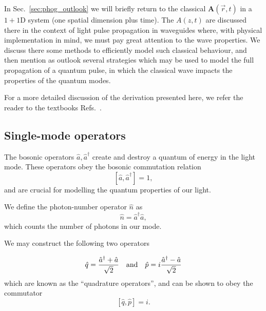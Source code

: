 In Sec.~\ref{sec:phog_outlook} we will briefly return to the classical $\bm{A}\left(\overrightarrow{r}, t\right)$ in a $1+1$D system (one spatial dimension plus time). The $A\left(z, t\right)$ are discussed there in the context of light pulse propagation in waveguides where, with physical implementation in mind, we must pay great attention to the wave properties. We discuss there some methods to efficiently model such classical behaviour, and then mention as outlook several strategies which may be used to model the full propagation of a quantum pulse, in which the classical wave impacts the properties of the quantum modes.

For a more detailed discussion of the derivation presented here, we refer the reader to the textbooks Refs.~\cite{Leonhardt2010, Walls_Millburn_Textbook, Gerry_Knight_Textbook}.


\FloatBarrier
\subsection{Single-mode operators}
The bosonic operators $\hat{a}, \hat{a}^\dagger$ create and destroy a quantum of energy in the light mode. These operators obey the bosonic commutation relation
\begin{equation}
\left[ \hat{a}, \hat{a}^\dagger \right] = 1,
\end{equation}
and are crucial for modelling the quantum properties of our light. 

We define the photon-number operator $\hat{n}$ as 
\begin{equation}
\hat{n} = \hat{a}^\dagger \hat{a},
\end{equation}
which counts the number of photons in our mode.

We may construct the following two operators

\begin{equation}\label{eqn:intro_quadrature}
\hat{q} = \frac{\hat{a}^\dagger + \hat{a}}{\sqrt{2}} \qq{and} \hat{p} = i \frac{\hat{a}^\dagger - \hat{a}}{\sqrt{2}}
\end{equation}
which are known as the ``quadrature operators'', and can be shown to obey the commutator
\begin{equation}\label{eqn:intro_quadrature_commutator}
\left[\hat{q}, \hat{p}\right] = i.
\end{equation}

